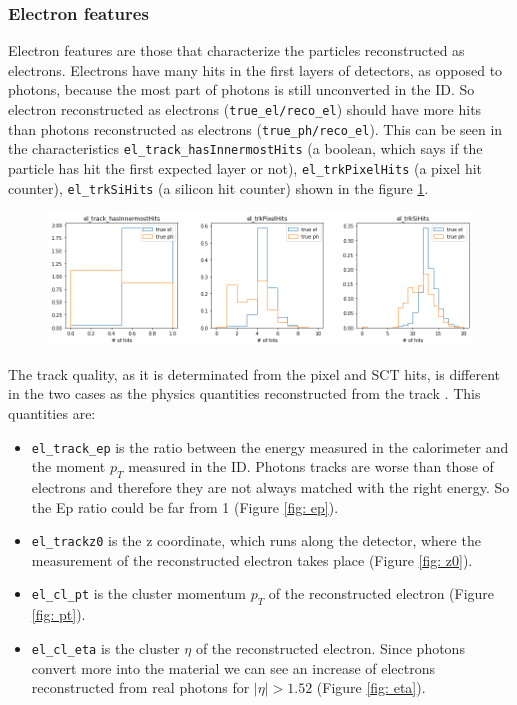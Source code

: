 \documentclass[a4paper, oneside]{book}
\begin{document}
				\subsubsection{Electron features}
					Electron features are those that characterize the particles reconstructed as electrons. Electrons have many hits in the first layers of detectors, as opposed to photons, because the most part of photons is still unconverted in the ID. So electron reconstructed as electrons (\texttt{true\_el/reco\_el}) should have more hits than photons reconstructed as electrons (\texttt{true\_ph/reco\_el}). This can be seen in the characteristics \texttt{el\_track\_hasInnermostHits} (a boolean, which says if the particle has hit the first expected layer or not), \texttt{el\_trkPixelHits} (a pixel hit counter), \texttt{el\_trkSiHits} (a silicon hit counter) shown in the figure \ref{fig:el_hit}.
					\begin{figure}[h!]
						\centering
						\includegraphics[width=0.7\textheight]{tesi_images/el_hit.png}
						\caption{}
						\label{fig:el_hit}
					\end{figure}
					
					The track quality, as it is determinated from the pixel and SCT hits, is different in the two cases as the physics quantities reconstructed from the track . This quantities are:
					\begin{itemize}
						\item \texttt{el\_track\_ep} is the ratio between the energy measured in the calorimeter and the moment $p_T$ measured in the ID. Photons tracks are worse than those of electrons and therefore they are not always matched with the right energy. So the Ep ratio could be far from 1 (Figure \ref{fig: ep}).
						\item \texttt{el\_trackz0} is the z coordinate, which runs along the detector, where the measurement of the reconstructed electron takes place (Figure \ref{fig: z0}).
						\item \texttt{el\_cl\_pt} is the cluster momentum $p_T$ of the reconstructed electron (Figure \ref{fig: pt}).
						\item \texttt{el\_cl\_eta} is the cluster $\eta$ of the reconstructed electron. Since photons convert more into the material we can see an increase of electrons reconstructed from real photons for $|\eta|>1.52$ (Figure \ref{fig: eta}).
					\end{itemize}
				
\end{document}
